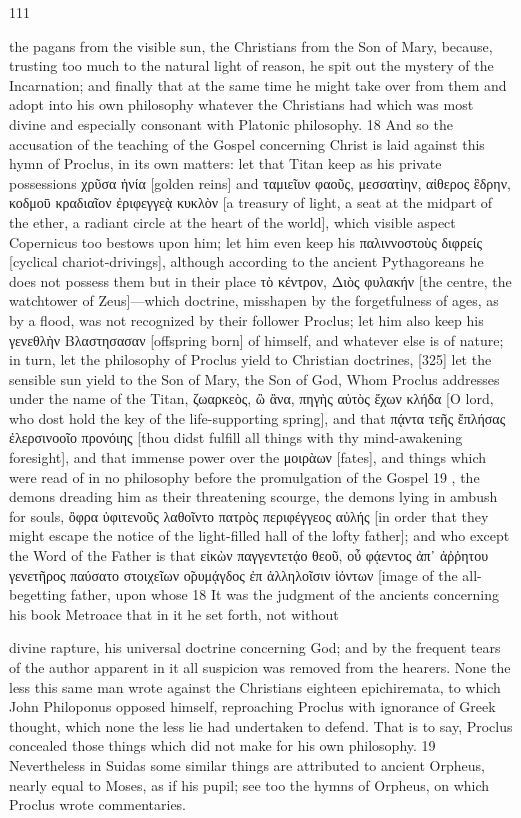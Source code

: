 \documentclass{article}
\begin{document}
111

the pagans from the visible sun, the Christians from the Son of Mary,
because, trusting too much to the natural light of reason, he spit out the
mystery of the Incarnation; and finally that at the same time he might
take over from them and adopt into his own philosophy whatever the
Christians had which was most divine and especially consonant with
Platonic philosophy. 18 And so the accusation of the teaching of the
Gospel concerning Christ is laid against this hymn of Proclus, in its own
matters: let that Titan keep as his private possessions χρῦσα ἡνία [golden
reins] and ταμιεῖυν φαοῦς, μεσσατὶην, αἰθερος ἓδρην, κοδμοῡ κραδιαῖον
ἐριφεγγεᾲ κυκλὸν [a treasury of light, a seat at the midpart of the ether, a
radiant circle at the heart of the world], which visible aspect Copernicus
too bestows upon him; let him even keep his παλιννοστοὺς διφρείς
[cyclical chariot-drivings], although according to the ancient
Pythagoreans he does not possess them but in their place τὸ κέντρον,
Διὸς φυλακήν [the centre, the watchtower of Zeus]—which doctrine,
misshapen by the forgetfulness of ages, as by a flood, was not recognized
by their follower Proclus; let him also keep his γενεθλὴν Βλαστησασαν
[offspring born] of himself, and whatever else is of nature; in turn, let the
philosophy of Proclus yield to Christian doctrines, [325] let the sensible
sun yield to the Son of Mary, the Son of God, Whom Proclus addresses
under the name of the Titan, ζωαρκεὸς, ὢ ἂνα, πηγὴς αὐτὸς ἔχων κλήδα
[O lord, who dost hold the key of the life-supporting spring], and that
πᾴντα τεῆς ἔπλήσας ἐλερσινοοῖο προνόιης [thou didst fulfill all things
with thy mind-awakening foresight], and that immense power over the
μοιρὰων [fates], and things which were read of in no philosophy before
the promulgation of the Gospel 19 , the demons dreading him as their
threatening scourge, the demons lying in ambush for souls, ὂφρα
ὐφιτενοῦς λαθοῖντο πατρὸς περιφέγγεος αὐλής [in order that they might
escape the notice of the light-filled hall of the lofty father]; and who
except the Word of the Father is that εἰκὼν παγγεντετᾴο θεοῦ, οὖ
φᾴεντος ἀπ᾽ ἀῤῥητου γενετῆρος παύσατο στοιχεῖων ο̃ρυμᾴγδος ἐπ
ἀλληλοῖσιν ἰὀντων [image of the all-begetting father, upon whose
18 It was the judgment of the ancients concerning his book Metroace that in it he set forth, not without

divine rapture, his universal doctrine concerning God; and by the frequent tears of the author
apparent in it all suspicion was removed from the hearers. None the less this same man wrote against
the Christians eighteen epichiremata, to which John Philoponus opposed himself, reproaching Proclus
with ignorance of Greek thought, which none the less lie had undertaken to defend. That is to say,
Proclus concealed those things which did not make for his own philosophy.
19 Nevertheless in Suidas some similar things are attributed to ancient Orpheus, nearly equal to
Moses, as if his pupil; see too the hymns of Orpheus, on which Proclus wrote commentaries.
\end{document}
